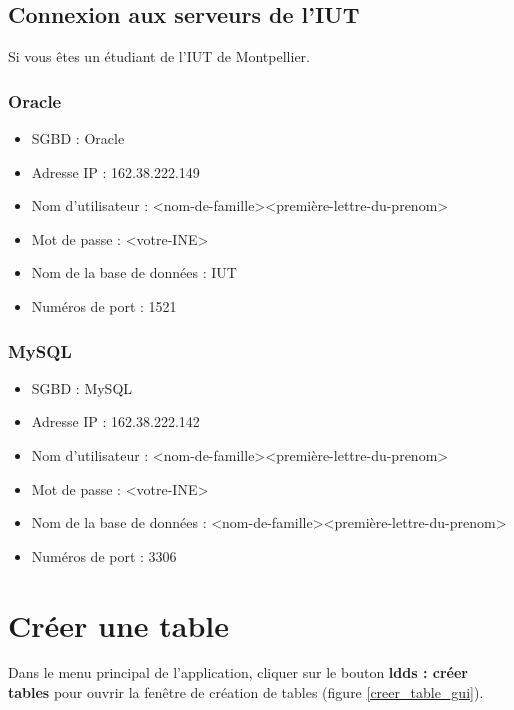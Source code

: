 \subsection{Connexion aux serveurs de l'IUT}
Si vous êtes un étudiant de l'IUT de Montpellier.

\subsubsection{Oracle}
\begin{itemize}
\item SGBD : Oracle
\item Adresse IP : 162.38.222.149
\item Nom d'utilisateur : <nom-de-famille><première-lettre-du-prenom>
\item Mot de passe : <votre-INE>
\item Nom de la base de données : IUT
\item Numéros de port : 1521 \\
\end{itemize}

\subsubsection{MySQL}
\begin{itemize}
\item SGBD : MySQL
\item Adresse IP : 162.38.222.142
\item Nom d'utilisateur : <nom-de-famille><première-lettre-du-prenom>
\item Mot de passe : <votre-INE>
\item Nom de la base de données : <nom-de-famille><première-lettre-du-prenom>
\item Numéros de port : 3306
\end{itemize}

\section{Créer une table}
Dans le menu principal de l'application, cliquer sur le bouton \textbf{\glspl{ldd} : créer tables} pour ouvrir la fen\^etre de création de tables (figure \ref{creer_table_gui}).

